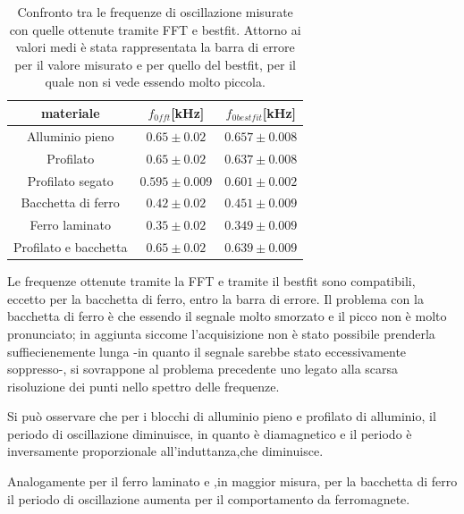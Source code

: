 \documentclass{article}
\begin{document}
        \begin{table}[H]
            \centering
            \caption{Confronto tra le frequenze di oscillazione misurate con quelle ottenute tramite FFT e bestfit.
                    Attorno ai valori medi è stata rappresentata la barra di errore per il valore
                    misurato e per quello del bestfit, per il quale non si vede essendo molto piccola.}
                \begin{tabular}{ccc}
                    materiale           &   $f_{0fft}$[kHz]     & $f_{0bestfit}$[kHz] \\
                    \hline
                    Alluminio pieno     & $0.65\pm0.02$         & $0.657\pm0.008$ \\
                    Profilato           & $0.65\pm0.02$         & $0.637\pm0.008$ \\
                    Profilato segato    & $0.595\pm0.009$       & $0.601\pm0.002$ \\
                    Bacchetta di ferro  & $0.42\pm0.02$         & $0.451\pm0.009$ \\
                    Ferro laminato      & $0.35\pm0.02$         & $0.349\pm0.009$ \\
                    Profilato e bacchetta& $0.65\pm0.02$        & $0.639\pm0.009$ \\  
                \end{tabular}
                \label{tab:mat_smor}

        \end{table}

        Le frequenze ottenute tramite la FFT e tramite il bestfit sono compatibili, 
        eccetto per la bacchetta di ferro, entro la barra di errore.
        Il problema con la bacchetta di ferro è che essendo il segnale molto smorzato 
        e il picco non è molto pronunciato; in aggiunta siccome l'acquisizione non è stato
        possibile prenderla suffiecienemente lunga -in quanto il segnale sarebbe stato 
        eccessivamente soppresso-, si sovrappone al problema precedente 
        uno legato alla scarsa risoluzione dei punti nello spettro delle frequenze.

        
        Si può osservare che per i blocchi di alluminio pieno e profilato di alluminio,
        il periodo di oscillazione diminuisce, in quanto è diamagnetico e il periodo
        è inversamente proporzionale all'induttanza,che diminuisce.
        
        Analogamente per il ferro laminato e ,in maggior misura, per la bacchetta di 
        ferro il periodo di oscillazione aumenta per il comportamento da ferromagnete.
        
\end{document}
